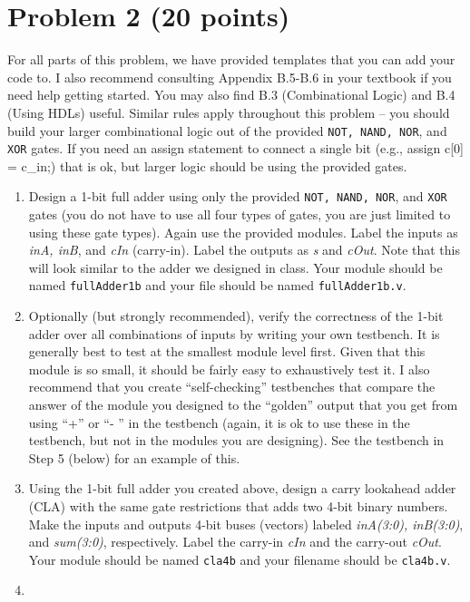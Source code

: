 \documentclass[12pt]{article}
\begin{document}
\section*{Problem 2 (20 points)}
For all parts of this problem, we have provided templates that you can add your code to.  
I also recommend consulting Appendix B.5-B.6 in your textbook
if you need help getting started. You may also find B.3 (Combinational Logic) and B.4 (Using HDLs)
useful. Similar rules apply throughout this problem – you should build your larger combinational logic out
of the provided \texttt{NOT, NAND, NOR}, and \texttt{XOR} gates. If you need an assign statement to connect
a single bit (e.g., assign c[0] = c\_in;) that is ok, but larger logic should be using the provided gates.

\begin{enumerate}
\item
Design a 1-bit full adder using only the provided \texttt{NOT, NAND, NOR}, and \texttt{XOR} gates
(you do not have to use all four types of gates, you are just limited to using these gate types). Again
use the provided modules. Label the inputs as \textit{inA, inB}, and \textit{cIn} (carry-in). Label the outputs as \textit{s}
and \textit{cOut}. Note that this will look similar to the adder we designed in class. Your module should
be named \texttt{fullAdder1b} and your file should be named \texttt{fullAdder1b.v}.
\item
Optionally (but strongly recommended), verify the correctness of the 1-bit adder over all
combinations of inputs by writing your own testbench. It is generally best to test at the smallest
module level first. Given that this module is so small, it should be fairly easy to exhaustively test
it. I also recommend that you create “self-checking” testbenches that compare the answer of the
module you designed to the “golden” output that you get from using “+” or “-
” in the testbench
(again, it is ok to use these in the testbench, but not in the modules you are designing). See the
testbench in Step 5 (below) for an example of this.
\item Using the 1-bit full adder you created above, design a carry lookahead adder (CLA) with the same
gate restrictions that adds two 4-bit binary numbers. Make the inputs and outputs 4-bit buses
(vectors) labeled \textit{inA(3:0), inB(3:0)}, and \textit{sum(3:0)}, respectively. Label the carry-in \textit{cIn} and the
carry-out \textit{cOut}. Your module should be named \texttt{cla4b} and your filename should be \texttt{cla4b.v}.
\item 

\end{enumerate}
\end{document}
